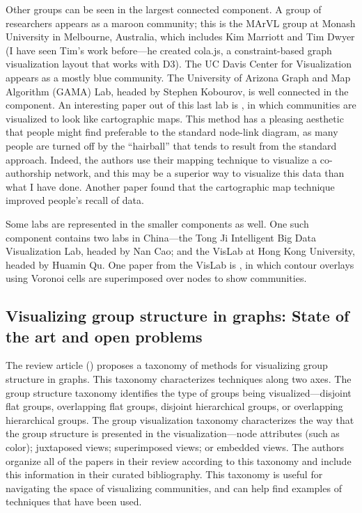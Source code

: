 Other groups can be seen in the largest connected component. A group of
researchers appears as a maroon community; this is the MArVL group at
Monash University in Melbourne, Australia, which includes Kim Marriott
and Tim Dwyer (I have seen Tim's work before---he created cola.js, a
constraint-based graph visualization layout that works with D3). The UC
Davis Center for Visualization appears as a mostly blue community. The
University of Arizona Graph and Map Algorithm (GAMA) Lab, headed by
Stephen Kobourov, is well connected in the component. An interesting
paper out of this last lab is \autocite{gansner_gmap:_2010}, in which
communities are visualized to look like cartographic maps. This method
has a pleasing aesthetic that people might find preferable to the
standard node-link diagram, as many people are turned off by the
``hairball'' that tends to result from the standard approach. Indeed,
the authors use their mapping technique to visualize a co-authorship
network, and this may be a superior way to visualize this data than what
I have done. Another paper \autocite{saket_map-based_2015} found that
the cartographic map technique improved people's recall of data.

Some labs are represented in the smaller components as well. One such
component contains two labs in China---the Tong Ji Intelligent Big Data
Visualization Lab, headed by Nan Cao; and the VisLab at Hong Kong
University, headed by Huamin Qu. One paper from the VisLab is
\autocite{wu_interactive_2015}, in which contour overlays using Voronoi
cells are superimposed over nodes to show communities.

\subsection{Visualizing group structure in graphs: State of the art and
open
problems}\label{visualizing-group-structure-in-graphs-state-of-the-art-and-open-problems}

The review article (\autocite{vehlow_state_2015}) proposes a taxonomy of
methods for visualizing group structure in graphs. This taxonomy
characterizes techniques along two axes. The group structure taxonomy
identifies the type of groups being visualized---disjoint flat groups,
overlapping flat groups, disjoint hierarchical groups, or overlapping
hierarchical groups. The group visualization taxonomy characterizes the
way that the group structure is presented in the visualization---node
attributes (such as color); juxtaposed views; superimposed views; or
embedded views. The authors organize all of the papers in their review
according to this taxonomy and include this information in their curated
bibliography. This taxonomy is useful for navigating the space of
visualizing communities, and can help find examples of techniques that
have been used.

